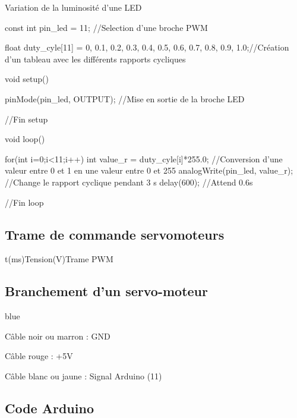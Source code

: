 \begin{Cpp}{Variation de la luminosité d'une LED}

  const int pin_led = 11; //Selection d'une broche PWM

  float duty_cyle[11] = {0, 0.1, 0.2, 0.3, 0.4, 0.5, 0.6, 0.7, 0.8, 0.9, 1.0};//Création d'un tableau avec les différents rapports cycliques
  
  void setup() {
  
      pinMode(pin_led, OUTPUT);  //Mise en sortie de la broche LED
  
  }//Fin setup
  
  void loop() {
  
      for(int i=0;i<11;i++) 
      {
          int value_r = duty_cyle[i]*255.0; //Conversion d'une valeur entre 0 et 1 en une valeur entre 0 et 255
          analogWrite(pin_led, value_r); //Change le rapport cyclique pendant 3 s
          delay(600);        //Attend 0.6s
      }
      
  
  }//Fin loop

\end{Cpp}

\subsection{Trame de commande servomoteurs}

\begin{graphic}{0.8}{0.4}{0}{62}{-1}{8}{t(ms)}{Tension(V)}{Trame PWM}

    
\end{graphic}


\subsection{Branchement d'un servo-moteur}

\begin{items}{blue}{\Bullet}
  \item Câble noir ou marron : GND 
  \item Câble rouge : +5V
  \item Câble blanc ou jaune : Signal Arduino (11)
\end{items}


\subsection{Code Arduino}


